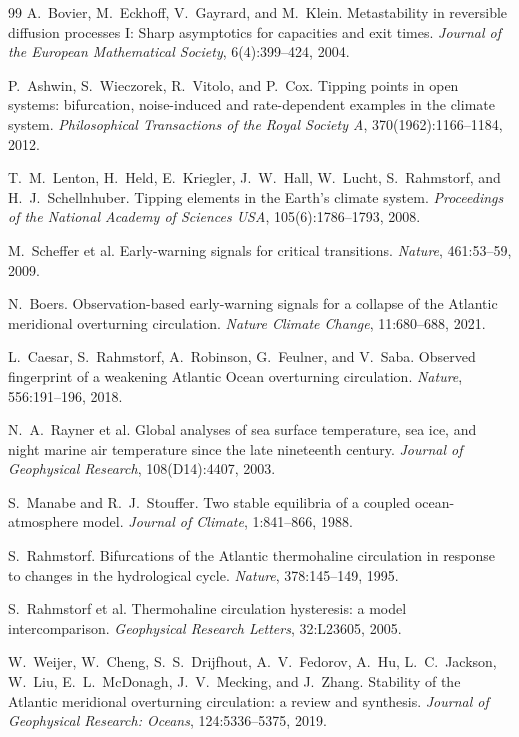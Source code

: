\documentclass[12pt,a4paper]{article}
\theoremstyle{definition}
\theoremstyle{plain}
\begin{document}
{\begin{thebibliography}{99}
A.~Bovier, M.~Eckhoff, V.~Gayrard, and M.~Klein.
\newblock Metastability in reversible diffusion processes I: Sharp asymptotics for capacities
and exit times.
\newblock \emph{Journal of the European Mathematical Society}, 6(4):399--424, 2004.

P.~Ashwin, S.~Wieczorek, R.~Vitolo, and P.~Cox.
\newblock Tipping points in open systems: bifurcation, noise-induced and rate-dependent
examples in the climate system.
\newblock \emph{Philosophical Transactions of the Royal Society A}, 370(1962):1166--1184, 2012.

T.~M.~Lenton, H.~Held, E.~Kriegler, J.~W.~Hall, W.~Lucht, S.~Rahmstorf, and
H.~J.~Schellnhuber.
\newblock Tipping elements in the Earth's climate system.
\newblock \emph{Proceedings of the National Academy of Sciences USA}, 105(6):1786--1793, 2008.

M.~Scheffer et al.
\newblock Early-warning signals for critical transitions.
\newblock \emph{Nature}, 461:53--59, 2009.

N.~Boers.
\newblock Observation-based early-warning signals for a collapse of the Atlantic meridional
overturning circulation.
\newblock \emph{Nature Climate Change}, 11:680--688, 2021.

L.~Caesar, S.~Rahmstorf, A.~Robinson, G.~Feulner, and V.~Saba.
\newblock Observed fingerprint of a weakening Atlantic Ocean overturning circulation.
\newblock \emph{Nature}, 556:191--196, 2018.

N.~A.~Rayner et al.
\newblock Global analyses of sea surface temperature, sea ice, and night marine air temperature
since the late nineteenth century.
\newblock \emph{Journal of Geophysical Research}, 108(D14):4407, 2003.

S.~Manabe and R.~J.~Stouffer.
\newblock Two stable equilibria of a coupled ocean-atmosphere model.
\newblock \emph{Journal of Climate}, 1:841--866, 1988.

S.~Rahmstorf.
\newblock Bifurcations of the Atlantic thermohaline circulation in response to changes in the
hydrological cycle.
\newblock \emph{Nature}, 378:145--149, 1995.

S.~Rahmstorf et al.
\newblock Thermohaline circulation hysteresis: a model intercomparison.
\newblock \emph{Geophysical Research Letters}, 32:L23605, 2005.

W.~Weijer, W.~Cheng, S.~S.~Drijfhout, A.~V.~Fedorov, A.~Hu, L.~C.~Jackson, W.~Liu,
E.~L.~McDonagh, J.~V.~Mecking, and J.~Zhang.
\newblock Stability of the Atlantic meridional overturning circulation: a review and synthesis.
\newblock \emph{Journal of Geophysical Research: Oceans}, 124:5336--5375, 2019.


\end{thebibliography}}
\end{document}
